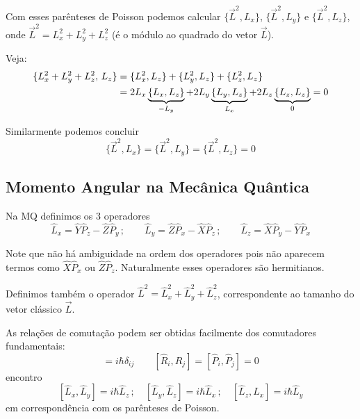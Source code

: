 Com esses parênteses de Poisson podemos calcular $\{\vec{L}^2, L_x\}$, $\{\vec{L}^2, L_y\}$ e $\{\vec{L}^2, L_z\}$, onde $\vec{L}^2 = L_x^2 + L_y^2 + L_z^2$ (é o módulo ao quadrado do vetor $\vec{L}$).

Veja:
\begin{align}
    \{L_x^2 + L_y^2 + L_z^2, \, L_z\} &= \{L_x^2, L_z\} + \{L_y^2, L_z\} + \{L_z^2, L_z\} \notag \\
    &= 2 L_x \underbrace{\{L_x, L_z\}}_{-L_y} + 2 L_y \underbrace{\{L_y, L_z\}}_{L_x} + 2 L_z \underbrace{\{L_z, L_z\}}_{0} = 0
\label{eq:aula19_L2_Lz_poisson}
\end{align}

Similarmente podemos concluir
\begin{equation}
    \boxed{\{\vec{L}^2, L_x\} = \{\vec{L}^2, L_y\} = \{\vec{L}^2, L_z\} = 0}
\label{eq:aula19_L2_poisson_zero}
\end{equation}

\subsection*{Momento Angular na Mecânica Quântica}

Na MQ definimos os 3 operadores
\begin{equation}
    \hat{L}_x = \hat{Y}\hat{P}_z - \hat{Z}\hat{P}_y \,; \qquad
    \hat{L}_y = \hat{Z}\hat{P}_x - \hat{X}\hat{P}_z \,; \qquad
    \hat{L}_z = \hat{X}\hat{P}_y - \hat{Y}\hat{P}_x
\label{eq:aula19_L_operadores}
\end{equation}

Note que não há ambiguidade na ordem dos operadores pois não aparecem termos como $\hat{X}\hat{P}_x$ ou $\hat{Z}\hat{P}_z$. Naturalmente esses operadores são hermitianos.

Definimos também o operador $\hat{L}^2 = \hat{L}_x^2 + \hat{L}_y^2 + \hat{L}_z^2$, correspondente ao tamanho do vetor clássico $\vec{L}$.

As relações de comutação podem ser obtidas facilmente dos comutadores fundamentais:
\begin{equation}
    [\hat{R}_i, \hat{P}_j] = i\hbar \delta_{ij} \qquad [\hat{R}_i, \hat{R}_j] = [\hat{P}_i, \hat{P}_j] = 0
\label{eq:aula19_comutadores_fundamentais}
\end{equation}
encontro
\begin{equation}
    \boxed{[\hat{L}_x, \hat{L}_y] = i\hbar \hat{L}_z \,; \quad [\hat{L}_y, \hat{L}_z] = i\hbar \hat{L}_x \,; \quad [\hat{L}_z, \hat{L}_x] = i\hbar \hat{L}_y}
\label{eq:aula19_comutadores_L}
\end{equation}
em correspondência com os parênteses de Poisson.


